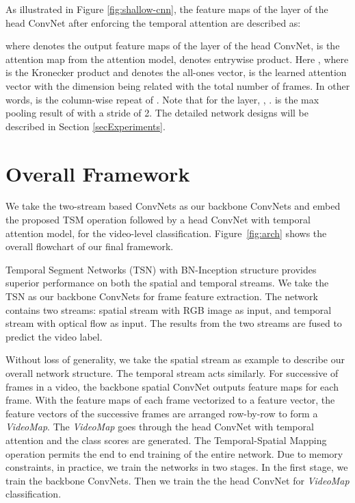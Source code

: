 \documentclass[english, 10pt, twocolumn, twoside]{IEEEtran}
\begin{document}
As illustrated in Figure \ref{fig:shallow-cnn}, the feature maps  of the  layer of the head ConvNet after enforcing the temporal attention are described as:



\noindent where  denotes the output feature maps of the  layer of the head ConvNet,  is the attention map from the attention model,  denotes entrywise product. Here , where  is the Kronecker product and  denotes the all-ones vector,  is the learned attention vector with the dimension being related with the total number of frames. In other words,  is the column-wise repeat of . Note that for the  layer, , .  is the max pooling result of  with a stride of 2. The detailed network designs will be described in Section \ref{secExperiments}.





\section{Overall Framework}



We take the two-stream based ConvNets as our backbone ConvNets and embed the proposed TSM operation followed by a head ConvNet with temporal attention model, for the video-level classification. Figure~\ref{fig:arch} shows the overall flowchart of our final framework.

Temporal Segment Networks (TSN) \cite{wang2016temporal} with BN-Inception structure \cite{ioffe2015batch} provides superior performance on both the spatial and temporal streams. We take the TSN as our backbone ConvNets for frame feature extraction. The network contains two streams: spatial stream with RGB image as input, and temporal stream with optical flow as input. The results from the two streams are fused to predict the video label.

Without loss of generality, we take the spatial stream as example to describe our overall network structure. The temporal stream acts similarly. For successive of frames in a video, the backbone spatial ConvNet outputs feature maps for each frame. With the feature maps of each frame vectorized to a feature vector, the feature vectors of the successive frames are arranged row-by-row to form a \emph{VideoMap}. The \emph{VideoMap} goes through the head ConvNet with temporal attention and the class scores are generated. The Temporal-Spatial Mapping operation permits the end to end training of the entire network. Due to memory constraints, in practice, we train the networks in two stages. In the first stage, we train the backbone ConvNets. Then we train the the head ConvNet for \emph{VideoMap} classification.
\end{document}
